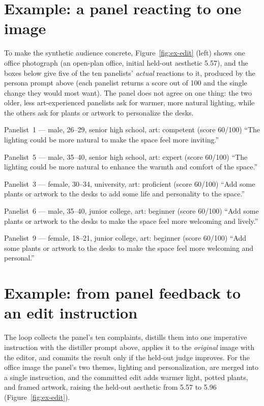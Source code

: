 \documentclass{article}
\begin{document}
\section{Example: a panel reacting to one image}
\label{sup:panel-example}
To make the synthetic audience concrete, Figure~\ref{fig:ex-edit} (left) shows one office photograph (an open-plan office, initial held-out aesthetic 5.57), and the boxes below give five of the ten panelists' \emph{actual} reactions to it, produced by the persona prompt above (each panelist returns a score out of 100 and the single change they would most want). The panel does not agree on one thing: the two older, less art-experienced panelists ask for warmer, more natural lighting, while the others ask for plants or artwork to personalize the desks.

\begin{personabox}{Panelist~1 --- male, 26--29, senior high school, art: competent \quad(score 60/100)}
\small ``The lighting could be more natural to make the space feel more inviting.''
\end{personabox}
\begin{personabox}{Panelist~5 --- male, 35--40, senior high school, art: expert \quad(score 60/100)}
\small ``The lighting could be more natural to enhance the warmth and comfort of the space.''
\end{personabox}
\begin{personabox}{Panelist~3 --- female, 30--34, university, art: proficient \quad(score 60/100)}
\small ``Add some plants or artwork to the desks to add some life and personality to the space.''
\end{personabox}
\begin{personabox}{Panelist~6 --- male, 35--40, junior college, art: beginner \quad(score 60/100)}
\small ``Add some plants or artwork to the desks to make the space feel more welcoming and lively.''
\end{personabox}
\begin{personabox}{Panelist~9 --- female, 18--21, junior college, art: beginner \quad(score 60/100)}
\small ``Add some plants or artwork to the desks to make the space feel more welcoming and personal.''
\end{personabox}

\section{Example: from panel feedback to an edit instruction}
\label{sup:aggregation}
The loop collects the panel's ten complaints, distills them into one imperative instruction with the distiller prompt above, applies it to the \emph{original} image with the editor, and commits the result only if the held-out judge improves. For the office image the panel's two themes, lighting and personalization, are merged into a single instruction, and the committed edit adds warmer light, potted plants, and framed artwork, raising the held-out aesthetic from 5.57 to 5.96 (Figure~\ref{fig:ex-edit}).
\end{document}
